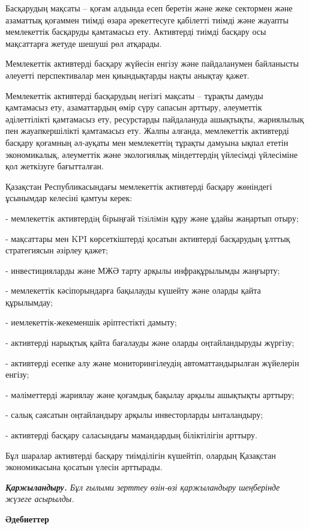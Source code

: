 {Басқарудың мақсаты -- қоғам алдында есеп беретін және жеке сектормен
және азаматтық қоғаммен тиімді өзара әрекеттесуге қабілетті тиімді және
жауапты мемлекеттік басқаруды қамтамасыз ету. Активтерді тиімді басқару
осы мақсаттарға жетуде шешуші рөл атқарады.

Мемлекеттік активтерді басқару жүйесін енгізу және пайдаланумен
байланысты әлеуетті перспективалар мен қиындықтарды нақты анықтау қажет.

Мемлекеттік активтерді басқарудың негізгі мақсаты -- тұрақты дамуды
қамтамасыз ету, азаматтардың өмір сүру сапасын арттыру, әлеуметтік
әділеттілікті қамтамасыз ету, ресурстарды пайдалануда ашықтықты,
жариялылық пен жауапкершілікті қамтамасыз ету. Жалпы алғанда,
мемлекеттік активтерді басқару қоғамның әл-ауқаты мен мемлекеттің
тұрақты дамуына ықпал ететін экономикалық, әлеуметтік және экологиялық
міндеттердің үйлесімді үйлесіміне қол жеткізуге бағытталған.

Қазақстан Республикасындағы мемлекеттік активтерді басқару жөніндегі
ұсынымдар келесіні қамтуы керек:

- мемлекеттiк активтердiң бiрыңғай тiзiлiмiн құру және ұдайы жаңартып
отыру;

- мақсаттары мен KPI көрсеткіштерді қосатын активтерді басқарудың ұлттық
стратегиясын әзірлеу қажет;

- инвестицияларды және МЖӘ тарту арқылы инфрақұрылымды жаңғырту;

- мемлекеттік кәсіпорындарға бақылауды күшейту және оларды қайта
құрылымдау;

- иемлекеттік-жекеменшік әріптестікті дамыту;

- активтерді нарықтық қайта бағалауды және оларды оңтайландыруды
жүргізу;

- активтерді есепке алу және мониторингілеудің автоматтандырылған
жүйелерін енгізу;

- мәліметтерді жариялау және қоғамдық бақылау арқылы ашықтықты арттыру;

- салық саясатын оңтайландыру арқылы инвесторларды ынталандыру;

- активтерді басқару саласындағы мамандардың біліктілігін арттыру.

Бұл шаралар активтерді басқару тиімділігін күшейтіп, олардың Қазақстан
экономикасына қосатын үлесін арттырады.

\emph{{\bfseries Қаржыландыру.} Бұл ғылыми зерттеу өзін-өзі қаржыландыру
шеңберінде жүзеге асырылды.}

{\bfseries Әдебиеттер}

}
